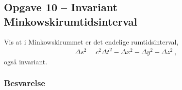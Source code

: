 \documentclass[../main.tex]{subfiles}
\begin{document}
\subsection{Opgave 10 -- Invariant Minkowskirumtidsinterval}
\setcounter{subsection}{10}
\setcounter{equation}{0}

Vis at i Minkowskirummet er det endelige rumtidsinterval,
\begin{align}
    \Delta s^2 = c^2 \Delta t^2 - \Delta x^2 - \Delta y^2 - \Delta z^2 \: ,
\end{align}
også invariant.


\subsubsection{Besvarelse}
\end{document}
